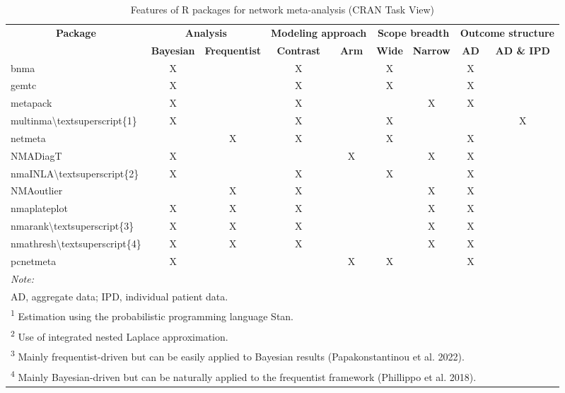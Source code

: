 \begin{table}

\caption{\label{tab:table-one}Features of R packages for network meta-analysis (CRAN Task View)}
\centering
\fontsize{7}{9}\selectfont
\begin{tabular}[t]{l|c|c|c|c|c|c|c|c}
\hline
\multicolumn{1}{c|}{\textbf{Package}} & \multicolumn{2}{c|}{\textbf{Analysis}} & \multicolumn{2}{c|}{\textbf{Modeling approach}} & \multicolumn{2}{c|}{\textbf{Scope breadth}} & \multicolumn{2}{c}{\textbf{Outcome structure}} \\
\cline{1-1} \cline{2-3} \cline{4-5} \cline{6-7} \cline{8-9}
\textbf{} & \textbf{Bayesian} & \textbf{Frequentist} & \textbf{Contrast} & \textbf{Arm} & \textbf{Wide} & \textbf{Narrow} & \textbf{AD} & \textbf{AD \& IPD}\\
\hline
bnma & X &  & X &  & X &  & X & \\
\hline
gemtc & X &  & X &  & X &  & X & \\
\hline
metapack & X &  & X &  &  & X & X & \\
\hline
multinma\textbackslash{}textsuperscript\{1\} & X &  & X &  & X &  &  & X\\
\hline
netmeta &  & X & X &  & X &  & X & \\
\hline
NMADiagT & X &  &  & X &  & X & X & \\
\hline
nmaINLA\textbackslash{}textsuperscript\{2\} & X &  & X &  & X &  & X & \\
\hline
NMAoutlier &  & X & X &  &  & X & X & \\
\hline
nmaplateplot & X & X & X &  &  & X & X & \\
\hline
nmarank\textbackslash{}textsuperscript\{3\} & X & X & X &  &  & X & X & \\
\hline
nmathresh\textbackslash{}textsuperscript\{4\} & X & X & X &  &  & X & X & \\
\hline
pcnetmeta & X &  &  & X & X &  & X & \\
\hline
\multicolumn{9}{l}{\rule{0pt}{1em}\textit{Note: }}\\
\multicolumn{9}{l}{\rule{0pt}{1em}AD, aggregate data; IPD, individual patient data.}\\
\multicolumn{9}{l}{\rule{0pt}{1em}\textsuperscript{1} Estimation using the probabilistic programming language Stan.}\\
\multicolumn{9}{l}{\rule{0pt}{1em}\textsuperscript{2} Use of integrated nested Laplace approximation.}\\
\multicolumn{9}{l}{\rule{0pt}{1em}\textsuperscript{3} Mainly frequentist-driven but can be easily applied to Bayesian results (Papakonstantinou et al. 2022).}\\
\multicolumn{9}{l}{\rule{0pt}{1em}\textsuperscript{4} Mainly Bayesian-driven but can be naturally applied to the frequentist framework (Phillippo et al. 2018).}\\
\end{tabular}
\end{table}

